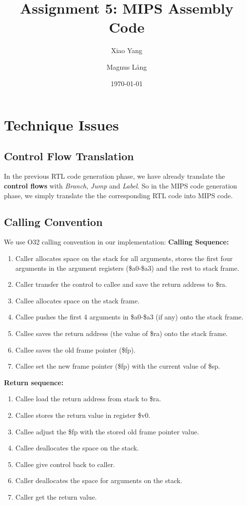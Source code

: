 \documentclass[a4paper,11pt]{article}
\title{Assignment 5: MIPS Assembly Code}
\author{Xiao Yang \and Magnus L{\aa}ng}
\date{\today}
\begin{document}
\maketitle

\section{Technique Issues}
\subsection{Control Flow Translation}
In the previous RTL code generation phase, we have already translate the \textbf{control flows} with \textit{Branch}, \textit{Jump} and \textit{Label}. So in the MIPS code generation phase, we simply translate the the corresponding RTL code into MIPS code.


\subsection{Calling Convention}
We use O32 calling convention in our implementation:
	\textbf{Calling Sequence:}
	\begin{enumerate}
		\item Caller allocates space on the stack for all arguments, stores the first four arguments in the argument registers (\$a0-\$a3) and the rest to stack frame.
		\item Caller transfer the control to callee and save the return address to \$ra.
		\item Callee allocates space on the stack frame.
		\item Callee pushes the first 4 arguments in \$a0-\$a3 (if any) onto the stack frame.
		\item Callee saves the return address (the value of \$ra) onto the stack frame.
		\item Callee saves the old frame pointer (\$fp).
		\item Callee set the new frame pointer (\$fp) with the current value of \$sp.
	\end{enumerate}

	\textbf{Return sequence:}
	\begin{enumerate}	
		\item Callee load the return address from stack to \$ra.
		\item Callee stores the return value in register \$v0.
		\item Callee adjust the \$fp with the stored old frame pointer value.
		\item Callee deallocates the space on the stack.
		\item Callee give control back to caller.
		\item Caller deallocates the space for arguments on the stack.
		\item Caller get the return value.

	\end{enumerate}
\end{document}
